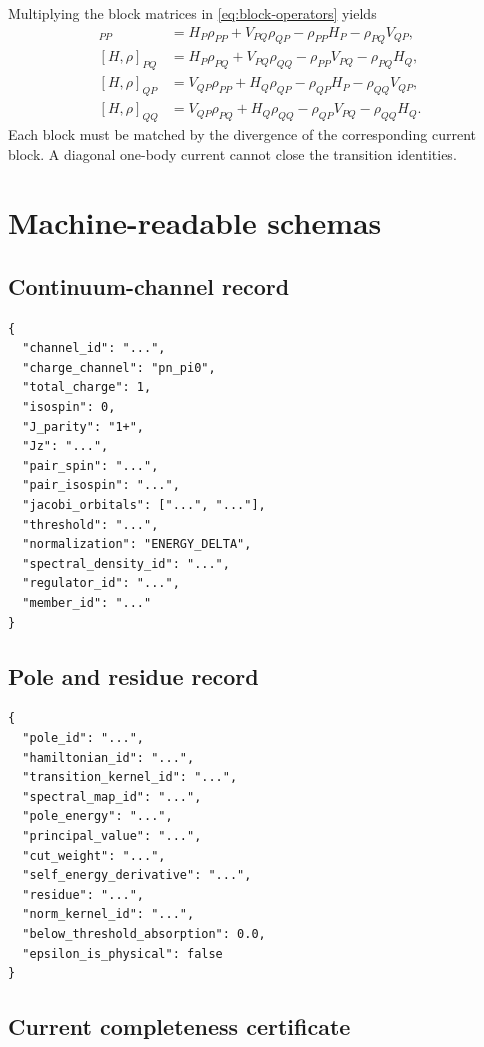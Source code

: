\documentclass[11pt]{article}
\begin{document}
Multiplying the block matrices in \cref{eq:block-operators} yields
\begin{align}
 [H,\rho]_{PP}
 &=H_P\rho_{PP}+V_{PQ}\rho_{QP}
 -\rho_{PP}H_P-\rho_{PQ}V_{QP},\\
 [H,\rho]_{PQ}
 &=H_P\rho_{PQ}+V_{PQ}\rho_{QQ}
 -\rho_{PP}V_{PQ}-\rho_{PQ}H_Q,\\
 [H,\rho]_{QP}
 &=V_{QP}\rho_{PP}+H_Q\rho_{QP}
 -\rho_{QP}H_P-\rho_{QQ}V_{QP},\\
 [H,\rho]_{QQ}
 &=V_{QP}\rho_{PQ}+H_Q\rho_{QQ}
 -\rho_{QP}V_{PQ}-\rho_{QQ}H_Q.
\end{align}
Each block must be matched by the divergence of the corresponding current
block.  A diagonal one-body current cannot close the transition identities.

\section{Machine-readable schemas}
\label{app:schemas}

\subsection{Continuum-channel record}

\begin{verbatim}
{
  "channel_id": "...",
  "charge_channel": "pn_pi0",
  "total_charge": 1,
  "isospin": 0,
  "J_parity": "1+",
  "Jz": "...",
  "pair_spin": "...",
  "pair_isospin": "...",
  "jacobi_orbitals": ["...", "..."],
  "threshold": "...",
  "normalization": "ENERGY_DELTA",
  "spectral_density_id": "...",
  "regulator_id": "...",
  "member_id": "..."
}
\end{verbatim}

\subsection{Pole and residue record}

\begin{verbatim}
{
  "pole_id": "...",
  "hamiltonian_id": "...",
  "transition_kernel_id": "...",
  "spectral_map_id": "...",
  "pole_energy": "...",
  "principal_value": "...",
  "cut_weight": "...",
  "self_energy_derivative": "...",
  "residue": "...",
  "norm_kernel_id": "...",
  "below_threshold_absorption": 0.0,
  "epsilon_is_physical": false
}
\end{verbatim}

\subsection{Current completeness certificate}
\end{document}

